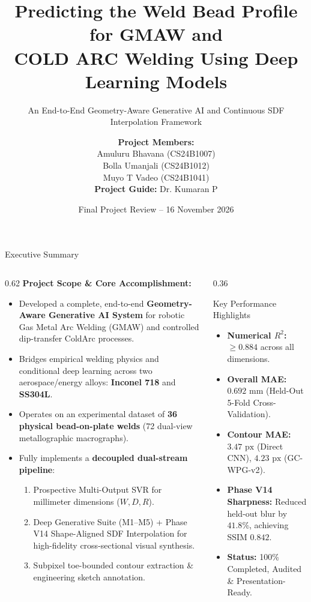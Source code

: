 \documentclass[aspectratio=169]{beamer}
\title[IP1302 Final Project Review]{
    Predicting the Weld Bead Profile for GMAW and\\
    COLD ARC Welding Using Deep Learning Models
}
\subtitle{An End-to-End Geometry-Aware Generative AI and Continuous SDF Interpolation Framework}
\author{
    \small
    \textbf{Project Members:}\\
    Amuluru Bhavana \quad (CS24B1007)\\
    Bolla Umanjali \quad (CS24B1012)\\
    Muyo T Vadeo \quad (CS24B1041)\\[0.15cm]
    \textbf{Project Guide:} Dr. Kumaran P
    \vspace{-0.2cm}
}
\institute{
    \small
    DATA - Department of Computer Science and Engineering\\
    National Institute of Technology Puducherry\\
    Karaikal - 609609, India
    \vspace{-0.2cm}
}
\date{\small Final Project Review -- 16 November 2026 \vspace{-0.3cm}}
\begin{document}
\begin{frame}
	\titlepage
\end{frame}

\begin{frame}{Executive Summary}
	\begin{columns}[T]
		\begin{column}{0.62\textwidth}
			\textbf{Project Scope \& Core Accomplishment:}
			\begin{itemize}
				\item Developed a complete, end-to-end \textbf{Geometry-Aware Generative AI System} for robotic Gas Metal Arc Welding (GMAW) and controlled dip-transfer ColdArc processes.
				\item Bridges empirical welding physics and conditional deep learning across two aerospace/energy alloys: \textbf{Inconel 718} and \textbf{SS304L}.
				\item Operates on an experimental dataset of \textbf{36 physical bead-on-plate welds} (72 dual-view metallographic macrographs).
				\item Fully implements a \textbf{decoupled dual-stream pipeline}:
				\begin{enumerate}
					\item Prospective Multi-Output SVR for millimeter dimensions ($W, D, R$).
					\item Deep Generative Suite (M1--M5) + Phase V14 Shape-Aligned SDF Interpolation for high-fidelity cross-sectional visual synthesis.
					\item Subpixel toe-bounded contour extraction \& engineering sketch annotation.
				\end{enumerate}
			\end{itemize}
		\end{column}
		\begin{column}{0.36\textwidth}
			\begin{block}{Key Performance Highlights}
				\begin{itemize}
					\item \textbf{Numerical $R^2$:} $\ge 0.884$ across all dimensions.
					\item \textbf{Overall MAE:} $0.692\text{ mm}$ (Held-Out 5-Fold Cross-Validation).
					\item \textbf{Contour MAE:} $3.47\text{ px}$ (Direct CNN), $4.23\text{ px}$ (GC-WPG-v2).
					\item \textbf{Phase V14 Sharpness:} Reduced held-out blur by $41.8\%$, achieving SSIM $0.842$.
					\item \textbf{Status:} 100\% Completed, Audited \& Presentation-Ready.
				\end{itemize}
			\end{block}
		\end{column}
	\end{columns}
\end{frame}
\end{document}
